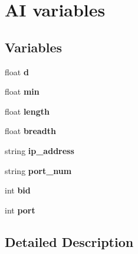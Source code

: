 \hypertarget{group___a_i___v_a_r_i_a_b_l_e_s}{\section{A\-I variables}
\label{group___a_i___v_a_r_i_a_b_l_e_s}
}
\subsection*{Variables}
\begin{DoxyCompactItemize}
\item 
\hypertarget{group___a_i___v_a_r_i_a_b_l_e_s_ga3fbbd8a3959e76a2bc3455d3bade52dc}{float {\bfseries d}}\label{group___a_i___v_a_r_i_a_b_l_e_s_ga3fbbd8a3959e76a2bc3455d3bade52dc}

\item 
\hypertarget{group___a_i___v_a_r_i_a_b_l_e_s_gad2e88d75f808e6d4e78d48bceb10c336}{float {\bfseries min}}\label{group___a_i___v_a_r_i_a_b_l_e_s_gad2e88d75f808e6d4e78d48bceb10c336}

\item 
\hypertarget{group___a_i___v_a_r_i_a_b_l_e_s_ga6150639f5295064e97e299a9206d16b1}{float {\bfseries length}}\label{group___a_i___v_a_r_i_a_b_l_e_s_ga6150639f5295064e97e299a9206d16b1}

\item 
\hypertarget{group___a_i___v_a_r_i_a_b_l_e_s_ga953d85f1267f8caddf492180e9d6497f}{float {\bfseries breadth}}\label{group___a_i___v_a_r_i_a_b_l_e_s_ga953d85f1267f8caddf492180e9d6497f}

\item 
\hypertarget{group___a_i___v_a_r_i_a_b_l_e_s_ga3d52f7ad289ed832b75b720715e9ac0f}{string {\bfseries ip\-\_\-address}}\label{group___a_i___v_a_r_i_a_b_l_e_s_ga3d52f7ad289ed832b75b720715e9ac0f}

\item 
\hypertarget{group___a_i___v_a_r_i_a_b_l_e_s_ga241d4814e4a8c7fdce0b6ed0d17e0084}{string {\bfseries port\-\_\-num}}\label{group___a_i___v_a_r_i_a_b_l_e_s_ga241d4814e4a8c7fdce0b6ed0d17e0084}

\item 
\hypertarget{group___a_i___v_a_r_i_a_b_l_e_s_ga3f481600e87b7e0473e1d72f45fb1b7e}{int {\bfseries bid}}\label{group___a_i___v_a_r_i_a_b_l_e_s_ga3f481600e87b7e0473e1d72f45fb1b7e}

\item 
\hypertarget{group___a_i___v_a_r_i_a_b_l_e_s_ga63c89c04d1feae07ca35558055155ffb}{int {\bfseries port}}\label{group___a_i___v_a_r_i_a_b_l_e_s_ga63c89c04d1feae07ca35558055155ffb}

\end{DoxyCompactItemize}


\subsection{Detailed Description}
